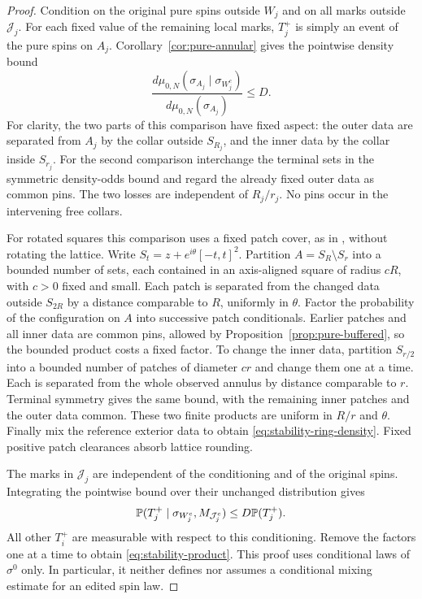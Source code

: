 \begin{proof}
Condition on the original pure spins outside $W_j$ and on all marks
outside $\mathcal J_j$.  For each fixed value of the remaining
local marks, $T_j^+$ is simply an event of the pure spins on $A_j$.
Corollary~\ref{cor:pure-annular} gives the pointwise density bound
\begin{equation}
 \frac{d\mu_{0,N}(\sigma_{A_j}\mid\sigma_{W_j^c})}
      {d\mu_{0,N}(\sigma_{A_j})}\leq D.
 \label{eq:stability-ring-density}
\end{equation}
For clarity, the two parts of this comparison have fixed aspect:
the outer data are separated from $A_j$ by the collar outside
$S_{R_j}$, and the inner data by the collar inside $S_{r_j}$.
For the second comparison interchange the terminal sets in the
symmetric density-odds bound and regard the already fixed outer
data as common pins.  The two losses are independent of $R_j/r_j$.
No pins occur in the intervening free collars.

For rotated squares this comparison uses a fixed patch cover, as in
\cite[Corollary~2.6]{OpenAIStatic2026}, without rotating the lattice. Write $S_t=z+e^{i\theta}[-t,t]^2$.
Partition $A=S_R\setminus S_r$ into a bounded number of sets, each
contained in an axis-aligned square of radius $cR$, with $c>0$ fixed
and small. Each patch is separated from the changed data outside
$S_{2R}$ by a distance comparable to $R$, uniformly in $\theta$.
Factor the probability of the configuration on $A$ into successive
patch conditionals. Earlier patches and all inner data are common
pins, allowed by Proposition~\ref{prop:pure-buffered}, so the bounded
product costs a fixed factor. To change the inner data, partition
$S_{r/2}$ into a bounded number of patches of diameter $cr$ and change
them one at a time. Each is separated from the whole observed annulus
by distance comparable to $r$. Terminal symmetry gives the same bound,
with the remaining inner patches and the outer data common. These
two finite products are uniform in $R/r$ and $\theta$. Finally mix
the reference exterior data to obtain
\eqref{eq:stability-ring-density}. Fixed positive patch clearances
absorb lattice rounding.

The marks in $\mathcal J_j$ are independent of the conditioning
and of the original spins.  Integrating the pointwise bound over
their unchanged distribution gives
\[
 \P(T_j^+\mid\sigma_{W_j^c},M_{\mathcal J_j^c})
       \leq D\P(T_j^+).
\]
All other $T_i^+$ are measurable with respect to this conditioning.
Remove the factors one at a time to obtain
\eqref{eq:stability-product}.  This proof uses conditional laws
of $\sigma^0$ only.  In particular, it neither defines nor assumes
a conditional mixing estimate for an edited spin law.
\end{proof}

